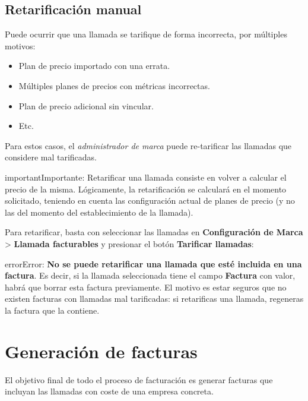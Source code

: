 \documentclass[letterpaper,10pt,spanish]{sphinxmanual}
\begin{document}
\subsection{Retarificación manual}
\label{billing_and_invoices/bill_a_call:retarificacion-manual}
Puede ocurrir que una llamada se tarifique de forma incorrecta, por múltiples motivos:
\begin{itemize}
\item {} 
Plan de precio importado con una errata.

\item {} 
Múltiples planes de precios con métricas incorrectas.

\item {} 
Plan de precio adicional sin vincular.

\item {} 
Etc.

\end{itemize}

Para estos casos, el \emph{administrador de marca} puede re-tarificar las llamadas que considere mal tarificadas.

\begin{notice}{important}{Importante:}
Retarificar una llamada consiste en volver a calcular el precio de la misma. Lógicamente, la retarificación se calculará en el momento solicitado, teniendo en cuenta las configuración actual de planes de precio (y no las del momento del establecimiento de la llamada).
\end{notice}

Para retarificar, basta con seleccionar las llamadas en \textbf{Configuración de Marca} \textgreater{} \textbf{Llamada facturables} y presionar el botón \textbf{Tarificar llamadas}:

\noindent{}

\begin{notice}{error}{Error:}
\textbf{No se puede retarificar una llamada que esté incluida en una factura}. Es decir, si la llamada seleccionada tiene el campo \textbf{Factura} con valor, habrá que borrar esta factura previamente. El motivo es estar seguros que no existen facturas con llamadas mal tarificadas: si retarificas una llamada, regeneras la factura que la contiene.
\end{notice}


\section{Generación de facturas}
\label{billing_and_invoices/invoices:invoices}\label{billing_and_invoices/invoices::doc}\label{billing_and_invoices/invoices:generacion-de-facturas}
El objetivo final de todo el proceso de facturación es generar facturas que incluyan las llamadas con coste de una empresa concreta.
\end{document}
